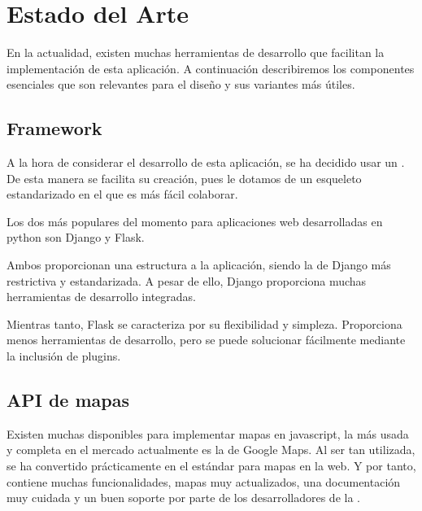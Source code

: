   
\chapter{Estado del Arte\label{CAP:ESTADOARTE}}
  En la actualidad, existen muchas herramientas de desarrollo que facilitan la implementación de esta aplicación. A continuación describiremos los componentes esenciales que son relevantes para el diseño y sus variantes más útiles.
  

    
  \section{Framework}
    A la hora de considerar el desarrollo de esta aplicación, se ha decidido usar un . De esta manera se facilita su creación, pues le dotamos de un esqueleto estandarizado en el que es más fácil colaborar.
    
    Los dos  más populares del momento para aplicaciones web desarrolladas en python son Django\cite{django} y Flask\cite{flask}.
    
    Ambos proporcionan una estructura a la aplicación, siendo la de Django más restrictiva y estandarizada. A pesar de ello, Django proporciona muchas herramientas de desarrollo integradas.
    
    Mientras tanto, Flask se caracteriza por su flexibilidad y simpleza. Proporciona menos herramientas de desarrollo, pero se puede solucionar fácilmente mediante la inclusión de plugins.
    
  
  \section{API de mapas}
  
    Existen muchas  disponibles para implementar mapas en javascript, la más usada y completa en el mercado actualmente es la de Google Maps\cite{gmaps}. Al ser tan utilizada, se ha convertido prácticamente en el estándar para mapas en la web. Y por tanto, contiene muchas funcionalidades, mapas muy actualizados, una documentación muy cuidada y un buen soporte por parte de los desarrolladores de la .
    
